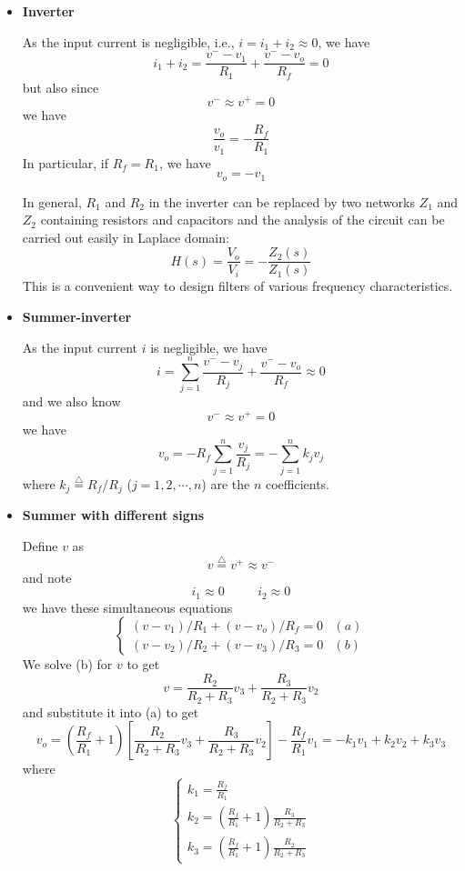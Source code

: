 \begin{itemize}
\item {\bf Inverter}


As the input current is negligible, i.e., $i=i_1+i_2 \approx 0$, we have
\[
	i_1+i_2= \frac{v^- -v_1}{R_1}+\frac{v^- -v_o}{R_f}=0
\]
but also since
\[	v^- \approx v^+ = 0	\]
we have
\[	\frac{v_o}{v_1}=-\frac{R_f}{R_1}	\]
In particular, if $R_f=R_1$, we have
\[	v_o=-v_1	\]

In general, $R_1$ and $R_2$ in the inverter can be replaced by two networks
$Z_1$ and $Z_2$ containing resistors and capacitors and the analysis of the
circuit can be carried out easily in Laplace domain:
\[	H(s)=\frac{V_o}{V_i}=-\frac{Z_2(s)}{Z_1(s)}	\]
This is a convenient way to design filters of various frequency 
characteristics.

\item {\bf Summer-inverter}


As the input current $i$ is negligible, we have
\[ i=\sum_{j=1}^n \frac{v^--v_j}{R_j}+\frac{v^--v_o}{R_f} \approx 0	\]
and we also know
\[	v^- \approx v^+= 0 \]
we have
\[
	v_o=-R_f \sum_{j=1}^n \frac{v_j}{R_j} = - \sum_{j=1}^n k_j v_j \]
where $k_j \stackrel{\triangle}{=}R_f/R_j$ ($j=1,2,\cdots,n$) are the $n$ 
coefficients.

\item {\bf Summer with different signs}


Define $v$ as
\[	v\stackrel{\triangle}{=}v^+ \approx v^- \]
and note
\[	i_1 \approx 0 \;\;\;\;\mbox{   }\;\;\; i_2 \approx 0	\]
we have these simultaneous equations
\[
\left\{ \begin{array}{ll} 
	(v-v_1)/R_1+(v-v_o)/R_f=0 & (a) \\
	(v-v_2)/R_2+(v-v_3)/R_3=0 & (b) 
	\end{array} \right.
\]
We solve (b) for $v$ to get
\[	v=\frac{R_2}{R_2+R_3} v_3 + \frac{R_3}{R_2+R_3}v_2	\]
and substitute it into (a) to get
\[
v_o=(\frac{R_f}{R_1}+1)[\frac{R_2}{R_2+R_3} v_3+\frac{R_3}{R_2+R_3} v_2]-\frac{R_f}{R_1}v_1
=-k_1v_1+k_2v_2+k_3v_3	
\]
where
\[ \left\{ \begin{array}{l} k_1=\frac{R_f}{R_1}	\\ 
	k_2=(\frac{R_f}{R_1}+1)\frac{R_3}{R_2+R_3} \\
	k_3=(\frac{R_f}{R_1}+1)\frac{R_2}{R_2+R_3} \end{array} \right.
\]


\end{itemize}
